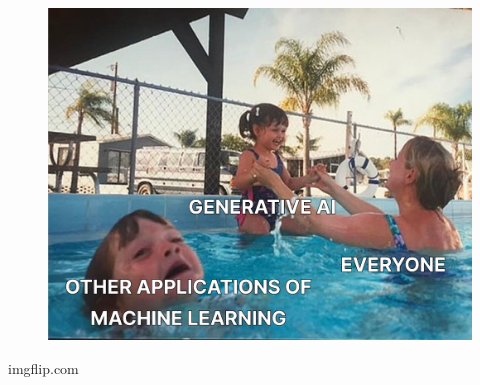 \begin{frame}[t]
{\begin{minipage}[b]{\textwidth}
\begin{minipage}[b]{0.33\textwidth}
\begin{figure}[ht]
                \includegraphics[width=\textwidth]{img/meme-3-cut.jpeg}
            \end{figure}
            \begin{flushright}
                \vspace*{-7pt}
                {\tiny\textcopyright imgflip.com}
            \end{flushright}
        \end{minipage}
        \begin{minipage}[b]{0.33\textwidth}
            \centering
            \begin{figure}[ht]

\end{figure}
\end{minipage}
\end{minipage}}
\end{frame}
